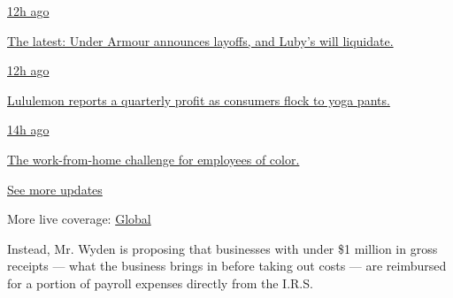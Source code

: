\href{https://www.nytimes3xbfgragh.onion/live/2020/09/08/business/stock-market-today-coronavirus?action=click\&pgtype=Article\&state=default\&region=MAIN_CONTENT_1\&context=storylines_live_updates\#the-latest-under-armour-announces-layoffs-and-lubys-will-liquidate}{12h
ago}

\href{https://www.nytimes3xbfgragh.onion/live/2020/09/08/business/stock-market-today-coronavirus?action=click\&pgtype=Article\&state=default\&region=MAIN_CONTENT_1\&context=storylines_live_updates\#the-latest-under-armour-announces-layoffs-and-lubys-will-liquidate}{The
latest: Under Armour announces layoffs, and Luby's will liquidate.}

\href{https://www.nytimes3xbfgragh.onion/live/2020/09/08/business/stock-market-today-coronavirus?action=click\&pgtype=Article\&state=default\&region=MAIN_CONTENT_1\&context=storylines_live_updates\#lululemon-reports-a-quarterly-profit-as-consumers-flock-to-yoga-pants}{12h
ago}

\href{https://www.nytimes3xbfgragh.onion/live/2020/09/08/business/stock-market-today-coronavirus?action=click\&pgtype=Article\&state=default\&region=MAIN_CONTENT_1\&context=storylines_live_updates\#lululemon-reports-a-quarterly-profit-as-consumers-flock-to-yoga-pants}{Lululemon
reports a quarterly profit as consumers flock to yoga pants.}

\href{https://www.nytimes3xbfgragh.onion/live/2020/09/08/business/stock-market-today-coronavirus?action=click\&pgtype=Article\&state=default\&region=MAIN_CONTENT_1\&context=storylines_live_updates\#the-work-from-home-challenge-for-employees-of-color}{14h
ago}

\href{https://www.nytimes3xbfgragh.onion/live/2020/09/08/business/stock-market-today-coronavirus?action=click\&pgtype=Article\&state=default\&region=MAIN_CONTENT_1\&context=storylines_live_updates\#the-work-from-home-challenge-for-employees-of-color}{The
work-from-home challenge for employees of color.}

\href{https://www.nytimes3xbfgragh.onion/live/2020/09/08/business/stock-market-today-coronavirus?action=click\&pgtype=Article\&state=default\&region=MAIN_CONTENT_1\&context=storylines_live_updates}{See
more updates}

More live coverage:
\href{https://www.nytimes3xbfgragh.onion/2020/09/08/world/covid-19-coronavirus.html?action=click\&pgtype=Article\&state=default\&region=MAIN_CONTENT_1\&context=storylines_live_updates}{Global}

Instead, Mr. Wyden is proposing that businesses with under \$1 million
in gross receipts --- what the business brings in before taking out
costs --- are reimbursed for a portion of payroll expenses directly from
the I.R.S.

